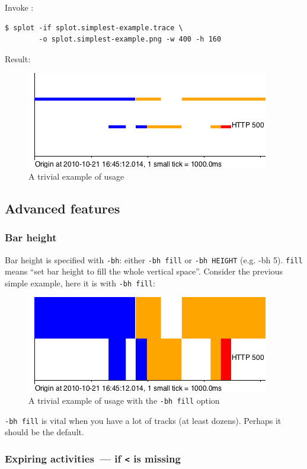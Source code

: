 \documentclass{article}
\begin{document}
Invoke \splot{}:
\begin{verbatim}
$ splot -if splot.simplest-example.trace \
        -o splot.simplest-example.png -w 400 -h 160
\end{verbatim}

Result:
\begin{figure}[h]
\center
\includegraphics[scale=0.5]{pics/splot/splot-simplest-example.png}
\caption{A trivial example of \splot{} usage}
\end{figure}

\subsection{Advanced features}

\subsubsection{Bar height}
Bar height is specified with \verb|-bh|: either \verb|-bh fill| or \verb|-bh HEIGHT| (e.g. -bh 5). \verb|fill| means ``set bar height to fill the whole vertical space''. Consider the previous simple example, here it is with \verb|-bh fill|:

\begin{figure}[h]
\center
\includegraphics[scale=0.5]{pics/splot/splot-simplest-example-fill.png}
\caption{A trivial example of \splot{} usage with the \texttt{-bh fill} option}
\end{figure}

\verb|-bh fill| is vital when you have a lot of tracks (at least dozens). Perhaps it should be the default.

\subsubsection{Expiring activities~--- if \texttt{<} is missing}
\end{document}
